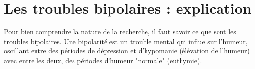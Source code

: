 \section{Les troubles bipolaires : explication}

Pour bien comprendre la nature de la recherche, il faut savoir ce que sont les troubles bipolaires. Une bipolarité est un trouble mental qui influe sur l'humeur, oscillant entre des périodes de dépression et d'hypomanie (élévation de l'humeur) avec entre les deux, des périodes d'humeur "normale" (euthymie).

